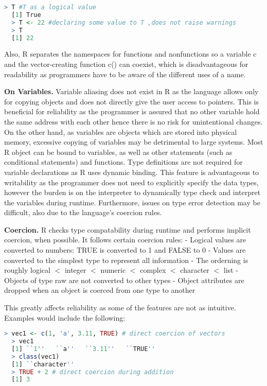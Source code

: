 \documentclass[12pt]{article}
\begin{document}
\begin{lstlisting}[language=R, frame=none]
  > T #T as a logical value
  [1] True
  > T <- 22 #declaring some value to T ,does not raise warnings
  > T
  [1] 22
\end{lstlisting}

Also, R separates the namespaces for functions and nonfunctions so a variable c and the vector-creating function c() can coexist, which is disadvantageous for readability as programmers have to be aware of the different uses of a name.

\textbf{On Variables.} Variable aliasing does not exist in R as the language allows only for copying objects and does not directly give the user access to pointers. This is beneficial for reliability as the programmer is assured that no other variable hold the same address with each other hence there is no risk for unintentional changes. On the other hand, as variables are objects which are stored into physical memory, excessive copying of variables may be detrimental to large systems. Most R object can be bound to variables, as well as other statements (such as conditional statements) and functions. Type definitions are not required for variable declarations as R uses dynamic binding. This feature is advantageous to writability as the programmer does not need to explicitly specify the data types, however the burden is on the interpreter to dynamically type check and interpret the variables during runtime. Furthermore, issues on type error detection may be difficult, also due to the language's coercion rules.

\textbf{Coercion.} R checks type compatability during runtime and performs implicit coercion, when possible. It follows certain coercion rules:
- Logical values are converted to numbers: TRUE is converted to 1 and FALSE to 0
- Values are converted to the simplest type to represent all information
- The orderning is roughly logical \(<\) integer \(<\) numeric \(<\) complex \(<\) character \(<\) list
- Objects of type raw are not converted to other types
- Object attributes are dropped when an object is coerced from one type to another

This greatly affects reliability as some of the features are not as intuitive. Examples would include the following:

\begin{lstlisting}[language=R, frame=none]
  > vec1 <- c(1, 'a', 3.11, TRUE) # direct coercion of vectors
  > vec1
  [1] ``1''   ``a''   ``3.11''   ``TRUE''
  > class(vec1)
  [1] ``character''
  > TRUE + 2 # direct coercion during addition
  [1] 3
\end{lstlisting}
\end{document}
